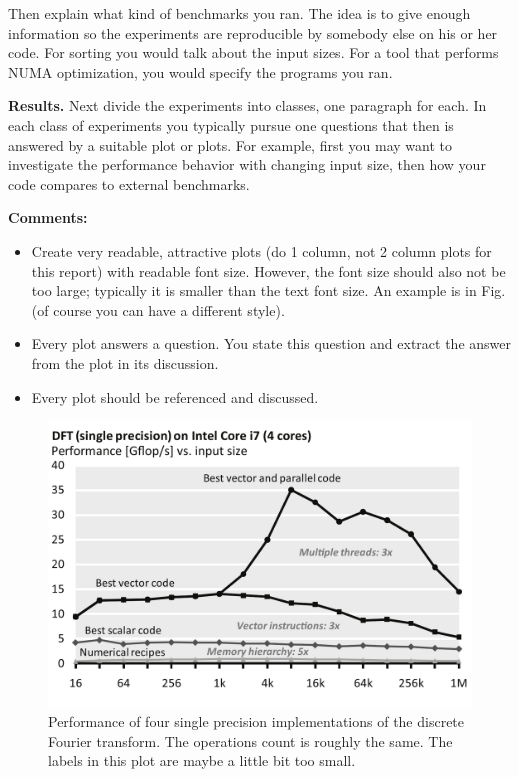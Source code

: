 \documentclass[sigconf]{acmart}
\newcommand{\mypar}[1]{{\bf #1.}}
\begin{document}
Then explain what kind of benchmarks you ran. The idea is to give enough
information so the experiments are reproducible by somebody else on his or her
code. For sorting you would talk about the input sizes. For a tool that
performs NUMA optimization, you would specify the programs you ran.

\mypar{Results}
Next divide the experiments into classes, one paragraph for each. In each class of experiments you typically pursue one questions that then is answered by a suitable plot or plots. For example, first you may want to investigate the performance behavior with changing input size, then how your code compares to external benchmarks.

  {\bf Comments:}
\begin{itemize}
  \item Create very readable, attractive plots (do 1 column, not 2 column plots for
        this report) with readable font size. However, the font size should also not be
        too large; typically it is smaller than the text font size. An example is in
        Fig. (of course you can have a different style).
  \item Every plot answers a question. You state this question and extract the answer
        from the plot in its discussion.
  \item Every plot should be referenced and discussed.
\end{itemize}

\begin{figure}\centering
  \includegraphics[scale=0.33]{example-plot}
  \caption{Performance of four single precision implementations of the
    discrete Fourier transform. The operations count is roughly the
    same. The labels in this plot are maybe a little bit too small.\label{fftperf}}
\end{figure}
\end{document}
